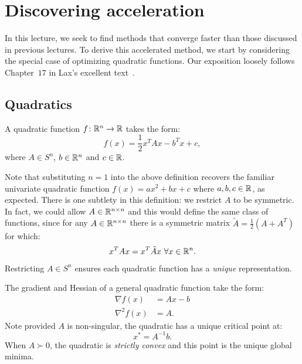 \section{Discovering acceleration}

In this lecture, we seek to find methods that converge faster than those
discussed in previous lectures. To derive this accelerated method, we start by
considering the special case of optimizing quadratic functions. Our exposition
loosely follows Chapter~$17$ in Lax's excellent text~\cite{lax}.

\subsection{Quadratics}

\begin{definition} A quadratic function $f\colon\mathbb{R}^n \to \mathbb{R}$ takes the form: 
\begin{equation*}
f(x) = \frac{1}{2}x^T A x - b^T x + c,
\end{equation*}
where $A \in S^n$, $b \in \mathbb{R}^n$ and $c \in \mathbb{R}$.
\end{definition}

Note that substituting $n=1$ into the above definition recovers the familiar univariate quadratic function $f(x) = ax^2 + bx + c$ where $a, b, c \in \mathbb{R}$, as expected. There is one subtlety in this definition: we restrict $A$ to be symmetric. In fact, we could allow $A \in \mathbb{R}^{n \times n}$ and this would define the same class of functions, since for any $A \in \mathbb{R}^{n \times n}$ there is a symmetric matrix $\tilde{A} = \frac{1}{2}\left(A + A^T\right)$ for which:
\begin{equation*}
x^TAx = x^T \tilde{A} x\ \forall x \in \mathbb{R}^n.
\end{equation*}
Restricting $A \in S^n$ ensures each quadratic function has a \textit{unique} representation.

The gradient and Hessian of a general quadratic function take the form:
\begin{align*}
\nabla f(x) &= Ax - b \\
\nabla^2 f(x) &= A.
\end{align*}
Note provided $A$ is non-singular, the quadratic has a unique critical point at:
\begin{equation*}
x^* = A^{-1}b.
\end{equation*}
When $A \succ 0$, the quadratic is \textit{strictly convex} and this point is the unique global minima.

